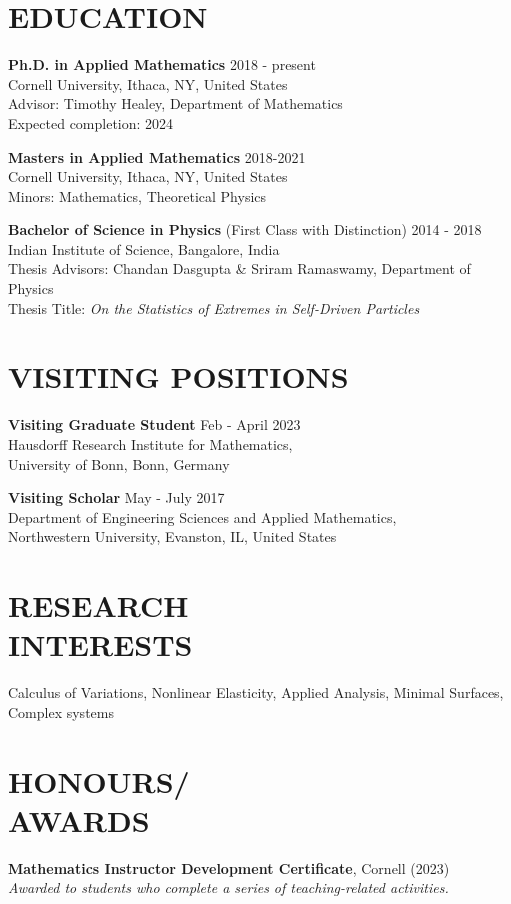 \documentclass[margin]{res} %
\begin{document}
\begin{resume}

\section{EDUCATION}  
\textbf{Ph.D. in Applied Mathematics} \hfill 2018 - present\\
Cornell University, Ithaca, NY, United States\\
Advisor: Timothy Healey, Department of Mathematics\\
Expected completion: 2024
\smallskip

\textbf{Masters in Applied Mathematics} \hfill 2018-2021\\
Cornell University, Ithaca, NY, United States\\
Minors: Mathematics, Theoretical Physics
\smallskip

\textbf{Bachelor of Science in Physics} (First Class with Distinction) \hfill 2014 - 2018 \\
Indian Institute of Science, Bangalore, India\\
Thesis Advisors: Chandan Dasgupta \& Sriram Ramaswamy, Department of Physics\\
Thesis Title: \textit{On the Statistics of Extremes in Self-Driven Particles}

\section{VISITING POSITIONS}
\textbf{Visiting Graduate Student} \hfill Feb - April 2023\\
Hausdorff Research Institute for Mathematics,\\
University of Bonn, Bonn, Germany
\smallskip

\textbf{Visiting Scholar} \hfill May - July 2017\\
Department of Engineering Sciences and Applied Mathematics,\\
Northwestern University, Evanston, IL, United States

\section{RESEARCH \\ INTERESTS} 

Calculus of Variations, Nonlinear Elasticity, Applied Analysis, Minimal Surfaces, Complex systems 
 
\section{HONOURS/\\AWARDS}
{\bf Mathematics Instructor Development Certificate}, Cornell (2023)\\
\textit{Awarded to students who complete a series of teaching-related activities.}


\end{resume}
\end{document}
